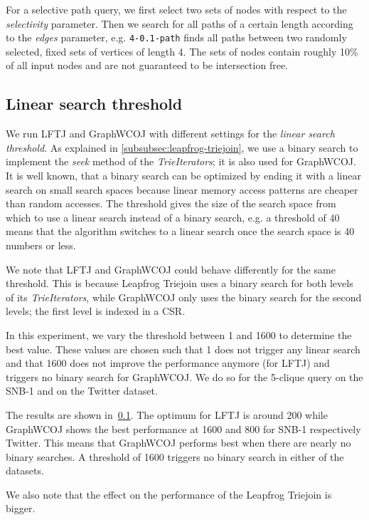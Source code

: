 For a selective path query, we first select two sets of nodes with respect to the \textit{selectivity} parameter.
Then we search for all paths of a certain length according to the \textit{edges} parameter, e.g. \texttt{4-0.1-path} finds all
paths between two randomly selected, fixed sets of vertices of length 4.
The sets of nodes contain roughly 10\% of all input nodes and are
not guaranteed to be intersection free.

\subsection{Linear search threshold}\label{subsec:linear-search-threshold}

We run \textsc{LFTJ} and GraphWCOJ with different settings for the \textit{linear search threshold}.
As explained in \cref{subsubsec:leapfrog-triejoin}, we use a binary search to implement the \textit{seek}
method of the \textit{TrieIterators};
it is also used for GraphWCOJ.
It is well known, that a binary search can be optimized by ending it with a linear search on small
search spaces because linear memory access patterns are cheaper than random accesses.
The threshold gives the size of the search space from which to use a linear search instead of
a binary search, e.g. a threshold of 40 means that the algorithm switches to a linear search
once the search space is 40 numbers or less.

We note that \textsc{LFTJ} and GraphWCOJ could behave differently for the same threshold.
This is because Leapfrog Triejoin uses a binary search for both levels of its \textit{TrieIterators},
while GraphWCOJ only uses the binary search for the second levels;
the first level is indexed in a \textsc{CSR}.

In this experiment, we vary the threshold between 1 and 1600 to determine the best value.
These values are chosen such that 1 does not trigger any linear search and that 1600
does not improve the performance anymore (for \textsc{LFTJ}) and triggers no
binary search for GraphWCOJ.
We do so for the 5-clique query on the SNB-1 and on the Twitter dataset.

The results are shown in~\cref{subsec:linear-search-threshold}.
The optimum for LFTJ is around 200 while GraphWCOJ shows the best performance at 1600 and 800 for
SNB-1 respectively Twitter.
This means that GraphWCOJ performs best when there are nearly no binary searches.
A threshold of 1600 triggers no binary search in either of the datasets.

We also note that the effect on the performance of the Leapfrog Triejoin is bigger.

